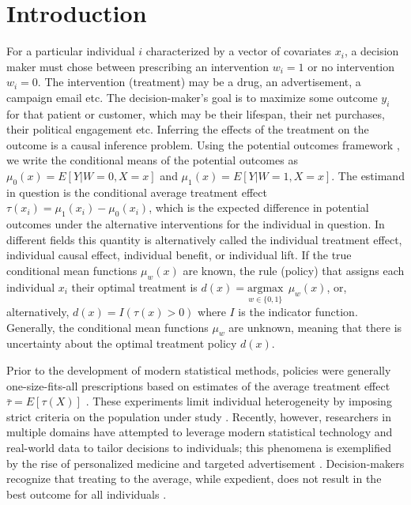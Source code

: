 \section{Introduction}

For a particular individual $i$ characterized by a vector of covariates $x_i$, a decision maker must chose between prescribing an intervention $w_i=1$ or no intervention $w_i=0$. The intervention (treatment) may be a drug, an advertisement, a campaign email etc. The decision-maker's goal is to maximize some outcome $y_i$ for that patient or customer, which may be their lifespan, their net purchases, their political engagement etc. Inferring the effects of the treatment on the outcome is a causal inference problem. Using the potential outcomes framework \cite{Rubin2005}, we write the conditional means of the potential outcomes as $\mu_0(x) = E[Y|W=0,X=x]$ and $\mu_1(x) = E[Y|W=1,X=x]$. The estimand in question is the conditional average treatment effect $\tau(x_i) = \mu_1(x_i) - \mu_0(x_i)$, which is the expected difference in potential outcomes under the alternative interventions for the individual in question. In different fields this quantity is alternatively called the individual treatment effect, individual causal effect, individual benefit, or individual lift. If the true conditional mean functions $\mu_w(x)$ are known, the rule (policy) that assigns each individual $x_i$ their optimal treatment is $d(x) = \underset{w \in \{0,1\}}{\text{argmax}} \ \ \mu_w(x)$, or, alternatively, $d(x) = I(\tau(x) > 0)$ where $I$ is the indicator function. Generally, the conditional mean functions $\mu_w$ are unknown, meaning that there is uncertainty about the optimal treatment policy $d(x)$.

Prior to the development of modern statistical methods, policies were generally one-size-fits-all prescriptions based on estimates of the average treatment effect $\bar\tau = E[\tau(X)]$ \cite{Segal:ub}. These experiments limit individual heterogeneity by imposing strict criteria on the population under study \cite{Stuart:2014id}. Recently, however, researchers in multiple domains have attempted to leverage modern statistical technology and real-world data to tailor decisions to individuals; this phenomena is exemplified by the rise of personalized medicine \cite{Ferreira:2017fv} and targeted advertisement \cite{Ascarza:2018ie, Matz:2017ix}. Decision-makers recognize that treating to the average, while expedient, does not result in the best outcome for all individuals \cite{Kravitz:2004fa,Segal:ub}. 

